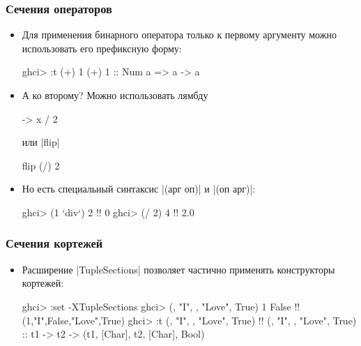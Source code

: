 \documentclass[10pt]{beamer}
\begin{document}
\begin{frame}[fragile]
  \frametitle{Сечения операторов}
  \begin{itemize}
    \item Для применения бинарного оператора только к первому аргументу можно использовать его префиксную форму:
          \begin{haskell}
            ghci> :t (+) 1
            (+) 1 :: Num a => a -> a
          \end{haskell}
          \pause
    \item А ко второму? Можно использовать лямбду
          \begin{haskell}
            \x -> x / 2
          \end{haskell}
          или \haskinline|flip|
          \begin{haskell}
            flip (/) 2
          \end{haskell}
          \pause
    \item Но есть специальный синтаксис \haskinline|(арг оп)| и \haskinline|(оп арг)|:
          \begin{haskell}
            ghci> (1 `div`) 2 !\pause!
            0
            ghci> (/ 2) 4 !\pause!
            2.0
          \end{haskell}
  \end{itemize}
\end{frame}

\begin{frame}[fragile]
  \frametitle{Сечения кортежей}
  \begin{itemize}
    \item Расширение \haskinline|TupleSections| позволяет частично применять конструкторы кортежей:
          \begin{haskell}
            ghci> :set -XTupleSections
            ghci> (, "I", , "Love", True) 1 False !\pause!
            (1,"I",False,"Love",True)
            ghci> :t (, "I", , "Love", True) !\pause!
            (, "I", , "Love", True)
              :: t1 -> t2 -> (t1, [Char], t2, [Char], Bool)
          \end{haskell}
  \end{itemize}
\end{frame}
\end{document}
